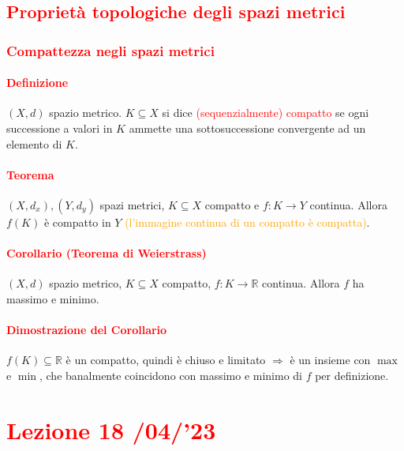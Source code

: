 \documentclass{article}
\newcommand{\R}{\mathbb{R}}
\begin{document}
\subsection{\textcolor{red}{Proprietà topologiche degli spazi metrici}}
\subsubsection{\textcolor{red}{Compattezza negli spazi metrici}}

\paragraph{\textcolor{red}{Definizione}}
$(X,d)$ spazio metrico. $K \subseteq X$ si dice \textcolor{red}{(sequenzialmente) compatto} se ogni successione a valori in $K$ ammette una sottosuccessione convergente ad un elemento di $K$.

\paragraph{\textcolor{red}{Teorema }}
$(X,d_x),(Y,d_y)$ spazi metrici, $K \subseteq X$ compatto e $f:K \rightarrow Y$ continua. Allora $f(K)$ è compatto in $Y$ \textcolor{orange}{(l'immagine continua di un compatto è compatta)}.

\paragraph{\textcolor{red}{Corollario (Teorema di Weierstrass)}}
$(X,d)$ spazio metrico, $K \subseteq X$ compatto, $f:K \rightarrow\R$ continua. Allora $f$ ha massimo e minimo.

\paragraph{\textcolor{red}{Dimostrazione del Corollario}}
$f(K)\subseteq \R$ è un compatto, quindi è chiuso e limitato $\Rightarrow$ è un insieme con $\max$ e $\min$, che banalmente coincidono con massimo e minimo di $f$ per definizione. 
\begin{flushright}
\large\Lightning
\end{flushright}

\newpage
\section{\textcolor{red}{Lezione 18 \space{}/04/'23}}
\end{document}
